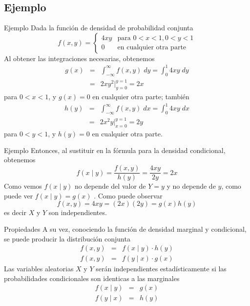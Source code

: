 \documentclass[11pt]{beamer}
\begin{document}
\subsection{Ejemplo}
\begin{frame}{Ejemplo}
Dada la función de densidad de probabilidad conjunta 
$$
f(x,y) =\left\{ \begin {matrix} 
4xy & \mbox{para } 0<x<1, 0<y<1 \\ 
0 & \mbox{en cualquier otra parte}
\end{matrix} \right . $$ 
Al obtener las integraciones necesarias, obtenemos
  \begin{eqnarray*}
g(x) &=&   \int_{- \infty}^{\infty}{f(x,y) \; dy}=\int_{0}^{1}{4xy \; dy}\\ 
&=& 2xy^2 \big|_{y=0}^{y=1}=2x
\end{eqnarray*}
para $0<x<1$, y $g(x)=0$ en cualquier otra parte; también
  \begin{eqnarray*}
h(y) &=&   \int_{- \infty}^{\infty}{f(x,y) \; dx}=\int_{0}^{1}{4xy \; dx}\\ 
&=& 2x^2y \big|_{x=0}^{y=1}=2y
\end{eqnarray*}
para $0<y<1$, y $h(y)=0$ en cualquier otra parte.
\end{frame}


\begin{frame}{Ejemplo}
Entonces, al sustituir en la fórmula para la densidad condicional, obtenemos 
$$f(x \mid y)=\frac{f(x,y)}{h(y)} = \frac{4xy}{2y}=2x$$ Como vemos $f(x \mid y)$ no depende del valor de $Y=y$ y no depende de $y$, como puede ver $f(x \mid y)=g(x)$ . Como puede observar 
$$ f(x,y)=4xy = (2x)(2y)=g(x)h(y)$$
es decir $X$ y $Y$ son independientes.
\end{frame}


\begin{frame}{Propiedades}
A su vez, conociendo la función de densidad marginal y condicional, se puede producir la distribución conjunta
\begin{eqnarray*}
f(x,y)&=&f(x\mid y)\cdot h(y) \\
f(x,y)&=&f(y\mid x)\cdot g(x) 
\end{eqnarray*}
Las variables aleatorias $X$ y $Y$ serán independientes estadísticamente si las probabilidades condicionales son identicas a las marginales
\begin{eqnarray*}
f(x\mid y) &=&g(x) \\
f(y\mid x)&=& h(y) 
\end{eqnarray*}

\end{frame}
\end{document}
